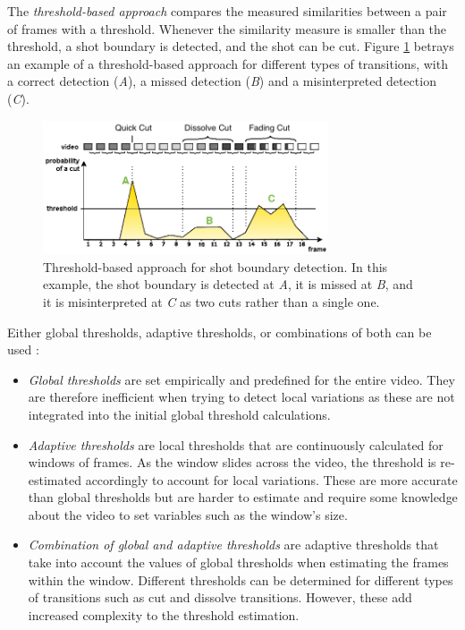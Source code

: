 The \textit{threshold-based approach} compares the measured similarities between a pair of frames with a threshold. Whenever the similarity measure is smaller than the threshold, a shot boundary is detected, and the shot can be cut. Figure \ref{fig:shot_boundary_detection_threshold} betrays an example of a threshold-based approach for different types of transitions, with a correct detection (\emph{A}), a missed detection (\emph{B}) and a misinterpreted detection (\emph{C}).\\

\begin{figure}[h] 
\centerline{\includegraphics[width=0.75\textwidth]{figures/litsurvey/shot_boundary_detection_threshold.png}}
\caption{\label{fig:shot_boundary_detection_threshold}Threshold-based approach for shot boundary detection. In this example, the shot boundary is detected at \emph{A}, it is missed at \emph{B}, and it is misinterpreted at \emph{C} as two cuts rather than a single one.}
\end{figure}

Either global thresholds, adaptive thresholds, or combinations of both can be used \cite{cernekova2006information} \cite{hu2011survey}:
\begin{itemize}
    \item \textit{Global thresholds} are set empirically and predefined for the entire video. They are therefore inefficient when trying to detect local variations as these are not integrated into the initial global threshold calculations.
    \item \textit{Adaptive thresholds} are local thresholds that are continuously calculated for windows of frames. As the window slides across the video, the threshold is re-estimated accordingly to account for local variations. These are more accurate than global thresholds but are harder to estimate and require some knowledge about the video to set variables such as the window's size.
    \item \textit{Combination of global and adaptive thresholds} are adaptive thresholds that take into account the values of global thresholds when estimating the frames within the window. Different thresholds can be determined for different types of transitions such as cut and dissolve transitions. However, these add increased complexity to the threshold estimation.
\end{itemize}


